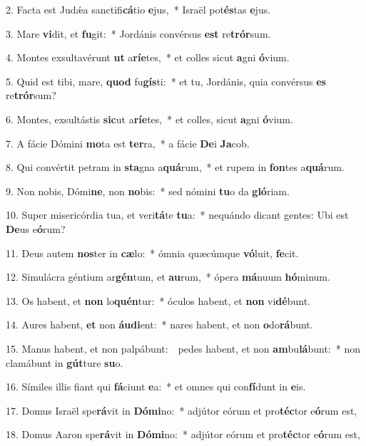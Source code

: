 2. Facta est Jud\'{\ae}a sanctifi\textbf{cá}tio \textbf{e}jus,~* 
	Israël pot\textbf{és}tas \textbf{e}jus.

3. Mare \textbf{vi}dit, et \textbf{fu}git:~* 
	Jordánis convérsus \textbf{est} re\textbf{trór}sum.

4. Montes exsultavérunt \textbf{ut} a\textbf{rí}\textbf{e}tes,~* 
	et colles sicut \textbf{a}gni \textbf{ó}vium.

5. Quid est tibi, mare, \textbf{quod} fu\textbf{gís}ti:~* 
	et tu, Jordánis, quia convérsus \textbf{es} re\textbf{trór}sum?

6. Montes, exsultástis \textbf{sic}ut a\textbf{rí}\textbf{e}tes,~* 
	et colles, sicut \textbf{a}gni \textbf{ó}vium.

7. A fácie Dómini \textbf{mo}ta est \textbf{ter}ra,~* 
	a fácie \textbf{De}i \textbf{Ja}cob.

8. Qui convértit petram in \textbf{sta}gna a\textbf{quá}rum,~* 
	et rupem in \textbf{fon}tes a\textbf{quá}rum.

9. Non nobis, Dómi\textbf{ne}, non \textbf{no}bis:~* 
	sed nómini \textbf{tu}o da \textbf{gló}riam.

10. Super misericórdia tua, et veri\textbf{tá}te \textbf{tu}a:~* 
	nequándo dicant gentes: Ubi est \textbf{De}us e\textbf{ó}rum?

11. Deus autem \textbf{nos}ter in \textbf{cæ}lo:~* 
	ómnia quæcúmque \textbf{vó}luit, \textbf{fe}cit.

12. Simulácra géntium ar\textbf{gén}tum, et \textbf{au}rum,~* 
	ópera \textbf{má}nuum \textbf{hó}minum.

13. Os habent, et \textbf{non} lo\textbf{quén}tur:~* 
	óculos habent, et \textbf{non} vi\textbf{dé}bunt.

14. Aures habent, \textbf{et} non \textbf{áu}\textbf{di}ent:~* 
	nares habent, et non \textbf{o}do\textbf{rá}bunt.

15. Manus habent, et non palpábunt:~{\color{red}\GreDagger}\ pedes habent, et non \textbf{am}bu\textbf{lá}bunt:~* 
	non clamábunt in \textbf{gút}ture \textbf{su}o.

16. Símiles illis fiant qui \textbf{fá}ciunt \textbf{e}a:~* 
	et omnes qui con\textbf{fí}dunt in \textbf{e}is.

17. Domus Israël spe\textbf{rá}vit in \textbf{Dó}\textbf{mi}no:~* 
	adjútor eórum et pro\textbf{téc}tor e\textbf{ó}rum est,

18. Domus Aaron spe\textbf{rá}vit in \textbf{Dó}\textbf{mi}no:~* 
	adjútor eórum et pro\textbf{téc}tor e\textbf{ó}rum est,

